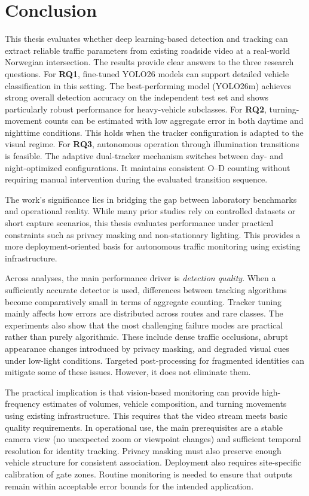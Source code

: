 \chapter{Conclusion}
\label{chap:conclusion}
This thesis evaluates whether deep learning-based detection and tracking can extract reliable traffic parameters from existing roadside video at a real-world Norwegian intersection. The results provide clear answers to the three research questions. For \textbf{RQ1}, fine-tuned YOLO26 models can support detailed vehicle classification in this setting. The best-performing model (YOLO26m) achieves strong overall detection accuracy on the independent test set and shows particularly robust performance for heavy-vehicle subclasses. For \textbf{RQ2}, turning-movement counts can be estimated with low aggregate error in both daytime and nighttime conditions. This holds when the tracker configuration is adapted to the visual regime. For \textbf{RQ3}, autonomous operation through illumination transitions is feasible. The adaptive dual-tracker mechanism switches between day- and night-optimized configurations. It maintains consistent O--D counting without requiring manual intervention during the evaluated transition sequence.

The work’s significance lies in bridging the gap between laboratory benchmarks and operational reality. While many prior studies rely on controlled datasets or short capture scenarios, this thesis evaluates performance under practical constraints such as privacy masking and non-stationary lighting. This provides a more deployment-oriented basis for autonomous traffic monitoring using existing infrastructure.

Across analyses, the main performance driver is \emph{detection quality}. When a sufficiently accurate detector is used, differences between tracking algorithms become comparatively small in terms of aggregate counting. Tracker tuning mainly affects how errors are distributed across routes and rare classes. The experiments also show that the most challenging failure modes are practical rather than purely algorithmic. These include dense traffic occlusions, abrupt appearance changes introduced by privacy masking, and degraded visual cues under low-light conditions. Targeted post-processing for fragmented identities can mitigate some of these issues. However, it does not eliminate them.

The practical implication is that vision-based monitoring can provide high-frequency estimates of volumes, vehicle composition, and turning movements using existing infrastructure. This requires that the video stream meets basic quality requirements. In operational use, the main prerequisites are a stable camera view (no unexpected zoom or viewpoint changes) and sufficient temporal resolution for identity tracking. Privacy masking must also preserve enough vehicle structure for consistent association. Deployment also requires site-specific calibration of gate zones. Routine monitoring is needed to ensure that outputs remain within acceptable error bounds for the intended application.

